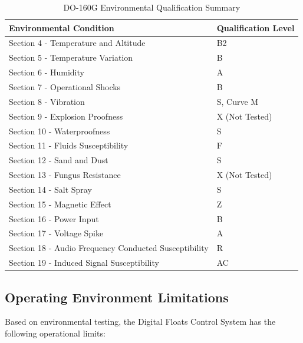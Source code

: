 \documentclass[12pt,a4paper,twoside,openright]{book}
\newcommand{\tabletextfont}{\normalfont\rmfamily}
\newcommand{\tableheadfont}{\normalfont\bfseries}
\begin{document}
\begin{table}[h]
\centering
\setlength{\tabcolsep}{5pt} %
\begin{tabular}{|p{}|p{}|}
\hline
\tableheadfont\textbf{Environmental Condition} & \tableheadfont\textbf{Qualification Level} \\
\hline
\tabletextfont Section 4 - Temperature and Altitude & B2 \\
\hline
\tabletextfont Section 5 - Temperature Variation & B \\
\hline
\tabletextfont Section 6 - Humidity & A \\
\hline
\tabletextfont Section 7 - Operational Shocks & B \\
\hline
\tabletextfont Section 8 - Vibration & S, Curve M \\
\hline
\tabletextfont Section 9 - Explosion Proofness & X (Not Tested) \\
\hline
\tabletextfont Section 10 - Waterproofness & S \\
\hline
\tabletextfont Section 11 - Fluids Susceptibility & F \\
\hline
\tabletextfont Section 12 - Sand and Dust & S \\
\hline
\tabletextfont Section 13 - Fungus Resistance & X (Not Tested) \\
\hline
\tabletextfont Section 14 - Salt Spray & S \\
\hline
\tabletextfont Section 15 - Magnetic Effect & Z \\
\hline
\tabletextfont Section 16 - Power Input & B \\
\hline
\tabletextfont Section 17 - Voltage Spike & A \\
\hline
\tabletextfont Section 18 - Audio Frequency Conducted Susceptibility & R \\
\hline
\tabletextfont Section 19 - Induced Signal Susceptibility & AC \\
\hline
\end{tabular}
\caption{DO-160G Environmental Qualification Summary}
\end{table}

\subsection{Operating Environment Limitations}

Based on environmental testing, the Digital Floats Control System has the following operational limits:
\end{document}
